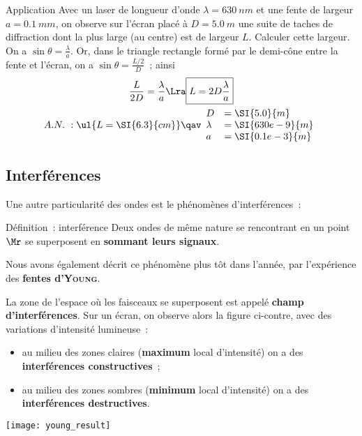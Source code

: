 \documentclass[../main/main.tex]{subfiles}
\begin{document}
\begin{rexem}{Application}
	Avec un laser de longueur d'onde $\lambda = \SI{630}{nm}$ et une fente de
	largeur $a = \SI{0.1}{mm}$, on observe sur l'écran placé à $D = \SI{5.0}{m}$
	une suite de taches de diffraction dont la plus large (au centre) est de
	largeur $L$. Calculer cette largeur.
	\tcblower
	On a $\sin{\theta} = \frac{\lambda}{a}$. Or, dans le triangle rectangle formé
	par le demi-cône entre la fente et l'écran, on a $\sin{\theta} =
		\frac{L/2}{D}$~; ainsi
	\begin{gather*}
		\frac{L}{2D} = \frac{\lambda}{a} \Lra \boxed{L = 2D \frac{\lambda}{a}}
		\\
		A.N.~: \ul{L = \SI{6.3}{cm}}
		\qav
		\begin{array}{ll}
			D       & = \SI{5.0}{m}
			\\
			\lambda & = \SI{630e-9}{m}
			\\
			a       & = \SI{0.1e-3}{m}
		\end{array}
	\end{gather*}
\end{rexem}

\subsection{Interférences}
\label{ssec:ondeint}
Une autre particularité des ondes est le phénomènes d'interférences~:
\begin{tdefi}{Définition~: interférence}
	Deux ondes de même nature se rencontrant en un point $\Mr$ se superposent en
	\textbf{sommant leurs signaux}.
\end{tdefi}
Nous avons également décrit ce phénomène plus tôt dans l'année, par l'expérience
des \textbf{fentes d'\textsc{Young}}.
\bigbreak
\noindent
\begin{minipage}{0.45\linewidth}
	La zone de l'espace où les faisceaux se superposent est appelé \textbf{champ
		d'interférences}. Sur un écran, on observe alors la figure ci-contre, avec
	des variations d'intensité lumineuse~:
	\begin{itemize}
		\item au milieu des zones claires (\textbf{maximum} local d'intensité)
		      on a des \textbf{interférences constructives}~;
		\item au milieu des zones sombres (\textbf{minimum} local d'intensité)
		      on a des \textbf{interférences destructives}.
	\end{itemize}
\end{minipage}
\hfill
\begin{minipage}{0.50\linewidth}
	\begin{center}
		\texttt{[image: young\_result]}
	\end{center}
\end{minipage}
\end{document}
